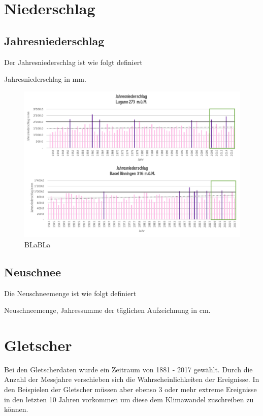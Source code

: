 \begin{refsection}
\section{Niederschlag}


\subsection{Jahresniederschlag}
Der Jahresniederschlag ist wie folgt definiert

\begin{definition}
Jahresniederschlag in mm.
\end{definition}


\begin{figure}[htbp]
\centering
\includegraphics[width=1.0\textwidth]{extrem/Jahresniederschlag.pdf}
\caption{BLaBLa}
\label{Jahresniederschlag}
\end{figure}



\subsection{Neuschnee}
Die Neuschneemenge ist wie folgt definiert

\begin{definition}
Neuschneemenge, Jahressumme der täglichen Aufzeichnung in cm.
\end{definition}



\section{Gletscher}
Bei den Gletscherdaten wurde ein Zeitraum von 1881 - 2017 gewählt. Durch die Anzahl der Messjahre verschieben sich die Wahrscheinlichkeiten der Ereignisse. In den Beispielen der Gletscher müssen aber ebenso 3 oder mehr extreme Ereignisse in den letzten 10 Jahren vorkommen um diese dem Klimawandel zuschreiben zu können.


\end{refsection}
